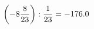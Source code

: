 \documentclass[preview]{standalone}
\begin{document}
\begin{align*}
\left( -8 { 8 \over 23 } \right)  :  { 1 \over 23 } = -176.0
\end{align*}
\end{document}
